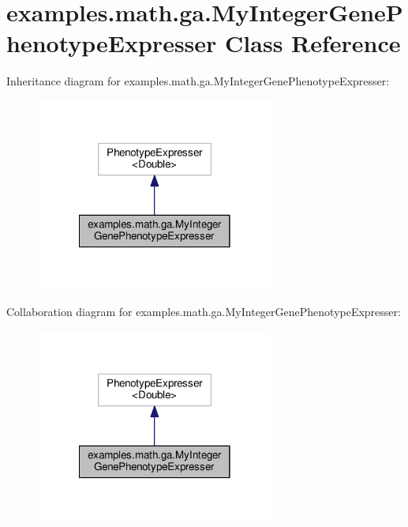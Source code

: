 \hypertarget{classexamples_1_1math_1_1ga_1_1_my_integer_gene_phenotype_expresser}{\section{examples.\-math.\-ga.\-My\-Integer\-Gene\-Phenotype\-Expresser Class Reference}
\label{classexamples_1_1math_1_1ga_1_1_my_integer_gene_phenotype_expresser}
}


Inheritance diagram for examples.\-math.\-ga.\-My\-Integer\-Gene\-Phenotype\-Expresser\-:
\nopagebreak
\begin{figure}[H]
\begin{center}
\leavevmode
\includegraphics[width=222pt]{classexamples_1_1math_1_1ga_1_1_my_integer_gene_phenotype_expresser__inherit__graph}
\end{center}
\end{figure}


Collaboration diagram for examples.\-math.\-ga.\-My\-Integer\-Gene\-Phenotype\-Expresser\-:
\nopagebreak
\begin{figure}[H]
\begin{center}
\leavevmode
\includegraphics[width=222pt]{classexamples_1_1math_1_1ga_1_1_my_integer_gene_phenotype_expresser__coll__graph}
\end{center}
\end{figure}
